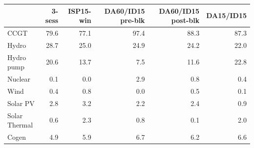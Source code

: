 \begin{tabular}{l r r r r r}
\toprule
 & 3-sess & ISP15-win & DA60/ID15 pre-blk & DA60/ID15 post-blk & DA15/ID15 \\
\midrule
CCGT & 79.6 & 77.1 & 97.4 & 88.3 & 87.3 \\
Hydro & 28.7 & 25.0 & 24.9 & 24.2 & 22.0 \\
Hydro pump & 20.6 & 13.7 & 7.5 & 11.6 & 22.8 \\
Nuclear & 0.1 & 0.0 & 2.9 & 0.8 & 0.4 \\
Wind & 0.4 & 0.8 & 0.0 & 0.5 & 0.1 \\
Solar PV & 2.8 & 3.2 & 2.2 & 2.4 & 0.9 \\
Solar Thermal & 0.6 & 2.3 & 0.8 & 0.1 & 2.0 \\
Cogen & 4.9 & 5.9 & 6.7 & 6.2 & 6.6 \\
\bottomrule
\end{tabular}
